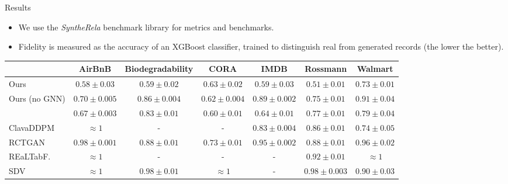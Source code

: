 \begin{frame}[fragile]{Results}
  \begin{itemize}
    \item We use the \textit{SyntheRela} benchmark library \citep{hudovernik2024benchmarking} for metrics and benchmarks.
    \item Fidelity is measured as the accuracy of an XGBoost classifier, trained to distinguish real from generated records (the lower the better).
  \end{itemize}

\begin{table}[ht]
\centering
\scriptsize
\begin{tabular}{lcccccc}
\toprule
 & \textbf{AirBnB} & \textbf{Biodegradability} & \textbf{CORA} & \textbf{IMDB} & \textbf{Rossmann} & \textbf{Walmart}\\
\midrule
Ours & $\mathbf{0.58 \pm 0.03}$ & $\mathbf{0.59 \pm 0.02}$ & $0.63 \pm 0.02$ & $\mathbf{0.59 \pm 0.03}$ & $\mathbf{0.51 \pm 0.01}$ & $\mathbf{0.73 \pm 0.01}$ \\
Ours (no GNN) & $0.70 \pm 0.005$ & $0.86 \pm 0.004$ & $0.62 \pm 0.004$ & $0.89 \pm 0.002$ & $0.75 \pm 0.01$ & $0.91 \pm 0.04$ \\
\citet{hudovernik2024relational} & $0.67 \pm 0.003$ & $0.83 \pm 0.01$ & $\mathbf{0.60 \pm 0.01}$ & $0.64 \pm 0.01$ & $0.77 \pm 0.01$ & $0.79 \pm 0.04$ \\
ClavaDDPM & $\approx 1$ & - & - & $0.83 \pm 0.004$ & $0.86 \pm 0.01$ & $0.74 \pm 0.05$ \\
RCTGAN  & $0.98 \pm 0.001$ & $0.88 \pm 0.01$ & $0.73 \pm 0.01$ & $0.95 \pm 0.002$ & $0.88 \pm 0.01$ & $0.96 \pm 0.02$ \\
REaLTabF. & $\approx 1$ & - & - & - & $0.92 \pm 0.01$ & $\approx 1$ \\
SDV & $\approx 1$ & $0.98 \pm 0.01$ & $\approx 1$ & - & $0.98 \pm 0.003$ & $0.90 \pm 0.03$ \\
\bottomrule
\end{tabular}
\label{tab:results}


\end{table}
\end{frame}

